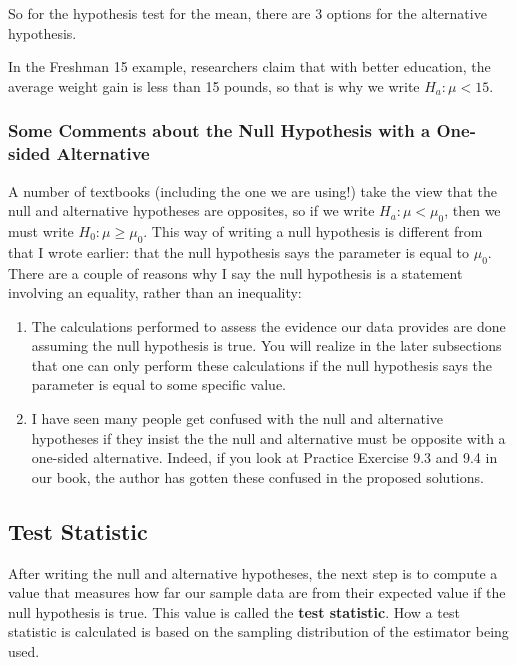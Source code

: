 \documentclass[
]{book}
\begin{document}
So for the hypothesis test for the mean, there are 3 options for the alternative hypothesis.

In the Freshman 15 example, researchers claim that with better education, the average weight gain is less than 15 pounds, so that is why we write \(H_a: \mu < 15\).

\subsubsection{Some Comments about the Null Hypothesis with a One-sided Alternative}\label{some-comments-about-the-null-hypothesis-with-a-one-sided-alternative}

A number of textbooks (including the one we are using!) take the view that the null and alternative hypotheses are opposites, so if we write \(H_a: \mu < \mu_0\), then we must write \(H_0: \mu \geq \mu_0\). This way of writing a null hypothesis is different from that I wrote earlier: that the null hypothesis says the parameter is equal to \(\mu_0\). There are a couple of reasons why I say the null hypothesis is a statement involving an equality, rather than an inequality:

\begin{enumerate}
\def\labelenumi{\arabic{enumi}.}
\item
  The calculations performed to assess the evidence our data provides are done assuming the null hypothesis is true. You will realize in the later subsections that one can only perform these calculations if the null hypothesis says the parameter is equal to some specific value.
\item
  I have seen many people get confused with the null and alternative hypotheses if they insist the the null and alternative must be opposite with a one-sided alternative. Indeed, if you look at Practice Exercise 9.3 and 9.4 in our book, the author has gotten these confused in the proposed solutions.
\end{enumerate}

\subsection{Test Statistic}\label{test-statistic}

After writing the null and alternative hypotheses, the next step is to compute a value that measures how far our sample data are from their expected value if the null hypothesis is true. This value is called the \textbf{test statistic}. How a test statistic is calculated is based on the sampling distribution of the estimator being used.
\end{document}
